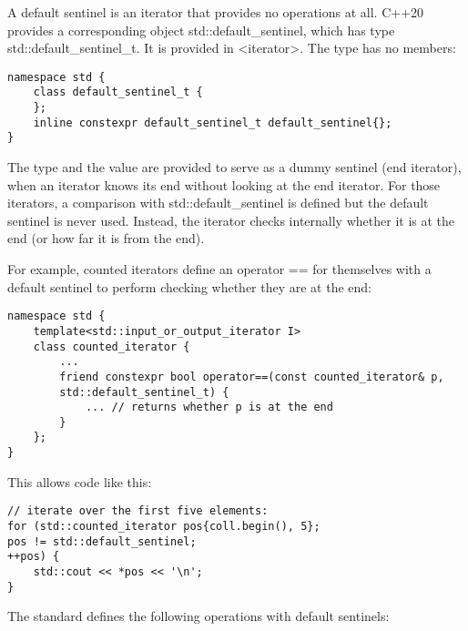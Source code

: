 A default sentinel is an iterator that provides no operations at all. C++20 provides a corresponding object std::default\_sentinel, which has type std::default\_sentinel\_t. It is provided in <iterator>. The type has no members:

\begin{lstlisting}[style=styleCXX]
namespace std {
	class default_sentinel_t {
	};
	inline constexpr default_sentinel_t default_sentinel{};
}
\end{lstlisting}

The type and the value are provided to serve as a dummy sentinel (end iterator), when an iterator knows its end without looking at the end iterator. For those iterators, a comparison with std::default\_sentinel is defined but the default sentinel is never used. Instead, the iterator checks internally whether it is at the end (or how far it is from the end).

For example, counted iterators define an operator == for themselves with a default sentinel to perform checking whether they are at the end:

\begin{lstlisting}[style=styleCXX]
namespace std {
	template<std::input_or_output_iterator I>
	class counted_iterator {
		...
		friend constexpr bool operator==(const counted_iterator& p,
		std::default_sentinel_t) {
			... // returns whether p is at the end
		}
	};
}
\end{lstlisting}

This allows code like this:

\begin{lstlisting}[style=styleCXX]
// iterate over the first five elements:
for (std::counted_iterator pos{coll.begin(), 5};
pos != std::default_sentinel;
++pos) {
	std::cout << *pos << '\n';
}
\end{lstlisting}

The standard defines the following operations with default sentinels:

